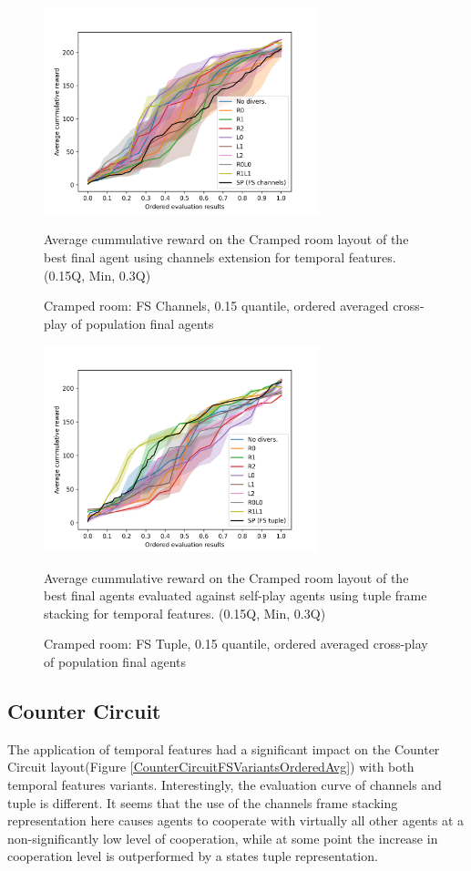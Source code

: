 \begin{figure}[!ht]
    \centering
    \includegraphics*[width=8cm]{../img/CrampedRoomFSChannelsOrdered15Q.png}

    \caption{Cramped room: FS Channels, 0.15 quantile, ordered averaged cross-play of population final agents}
    \label{CrampedRoomFSChannelsOrdered15Q}
    \medskip
    \small 
    Average cummulative reward on the Cramped room layout of the best final agent using channels extension for temporal features.    
    (0.15Q, Min, 0.3Q)

\end{figure}

\begin{figure}[!ht]
    \centering
    \includegraphics*[width=8cm]{../img/CrampedRoomFSTupleOrdered15Q.png}

    \caption{Cramped room: FS Tuple, 0.15 quantile, ordered averaged cross-play of population final agents}
    \label{CrampedRoomFSTupleOrdered15Q}
    \medskip
    \small 
    Average cummulative reward on the Cramped room layout of the best final agents evaluated against self-play agents using tuple frame stacking for temporal features.
    (0.15Q, Min, 0.3Q)

\end{figure}

\newpage

\subsection{Counter Circuit}
The application of temporal features had a significant impact on the Counter Circuit layout(Figure \ref{CounterCircuitFSVariantsOrderedAvg}) with both temporal features variants.
Interestingly, the evaluation curve of channels and tuple is different. 
It seems that the use of the channels frame stacking representation here causes agents to cooperate with virtually all other agents at a non-significantly low level of cooperation, while at some point the increase in cooperation level is outperformed by a states tuple representation.

